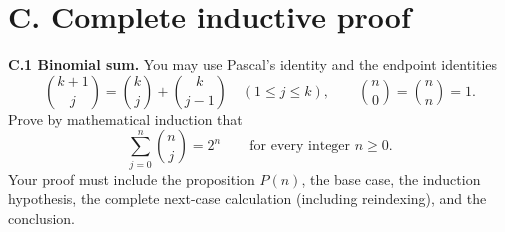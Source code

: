 \documentclass[11pt]{article}
\begin{document}
\section*{C. Complete inductive proof}
\textbf{C.1 Binomial sum.}
You may use Pascal's identity and the endpoint identities
\[
  \binom{k+1}{j}=\binom{k}{j}+\binom{k}{j-1}
  \quad(1\le j\le k),
  \qquad
  \binom{n}{0}=\binom{n}{n}=1.
\]
Prove by mathematical induction that
\[
  \sum_{j=0}^{n}\binom{n}{j}=2^n
  \qquad\text{for every integer }n\ge0.
\]
Your proof must include the proposition $P(n)$, the base case, the induction
hypothesis, the complete next-case calculation (including reindexing), and the
conclusion.

\clearpage
\begin{responsebox}
\vspace{8.25in}
\end{responsebox}
\end{document}
